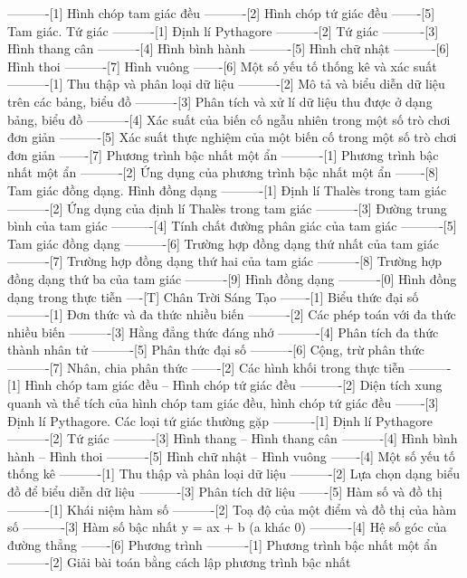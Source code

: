 ----------[1] Hình chóp tam giác đều
----------[2] Hình chóp tứ giác đều
-------[5] Tam giác. Tứ giác
----------[1] Định lí Pythagore
----------[2] Tứ giác
----------[3] Hình thang cân
----------[4] Hình bình hành
----------[5] Hình chữ nhật
----------[6] Hình thoi
----------[7] Hình vuông
-------[6] Một số yếu tố thống kê và xác suất
----------[1] Thu thập và phân loại dữ liệu
----------[2] Mô tả và biểu diễn dữ liệu trên các bảng, biểu đồ
----------[3] Phân tích và xử lí dữ liệu thu được ở dạng bảng, biểu đồ
----------[4] Xác suất của biến cố ngẫu nhiên trong một số trò chơi đơn giản
----------[5] Xác suất thực nghiệm của một biến cố trong một số trò chơi đơn giản
-------[7] Phương trình bậc nhất một ẩn
----------[1] Phương trình bậc nhất một ẩn
----------[2] Ứng dụng của phương trình bậc nhất một ẩn
-------[8] Tam giác đồng dạng. Hình đồng dạng
----------[1] Định lí Thalès trong tam giác
----------[2] Ứng dụng của định lí Thalès trong tam giác
----------[3] Đường trung bình của tam giác
----------[4] Tính chất đường phân giác của tam giác
----------[5] Tam giác đồng dạng
----------[6] Trường hợp đồng dạng thứ nhất của tam giác
----------[7] Trường hợp đồng dạng thứ hai của tam giác
----------[8] Trường hợp đồng dạng thứ ba của tam giác
----------[9] Hình đồng dạng
----------[0] Hình đồng dạng trong thực tiễn
----[T] Chân Trời Sáng Tạo
-------[1] Biểu thức đại số
----------[1] Đơn thức và đa thức nhiều biến
----------[2] Các phép toán với đa thức nhiều biến
----------[3] Hằng đẳng thức đáng nhớ
----------[4] Phân tích đa thức thành nhân tử
----------[5] Phân thức đại số
----------[6] Cộng, trừ phân thức
----------[7] Nhân, chia phân thức
-------[2] Các hình khối trong thực tiễn
----------[1] Hình chóp tam giác đều – Hình chóp tứ giác đều
----------[2] Diện tích xung quanh và thể tích của hình chóp tam giác đều, hình chóp tứ giác đều
-------[3] Định lí Pythagore. Các loại tứ giác thường gặp
----------[1] Định lí Pythagore
----------[2] Tứ giác
----------[3] Hình thang – Hình thang cân
----------[4] Hình bình hành – Hình thoi
----------[5] Hình chữ nhật – Hình vuông
-------[4] Một số yếu tố thống kê
----------[1] Thu thập và phân loại dữ liệu
----------[2] Lựa chọn dạng biểu đồ để biểu diễn dữ liệu
----------[3] Phân tích dữ liệu
-------[5] Hàm số và đồ thị
----------[1] Khái niệm hàm số
----------[2] Toạ độ của một điểm và đồ thị của hàm số
----------[3] Hàm số bậc nhất y = ax + b (a khác 0)
----------[4] Hệ số góc của đường thẳng
-------[6] Phương trình
----------[1] Phương trình bậc nhất một ẩn
----------[2] Giải bài toán bằng cách lập phương trình bậc nhất
